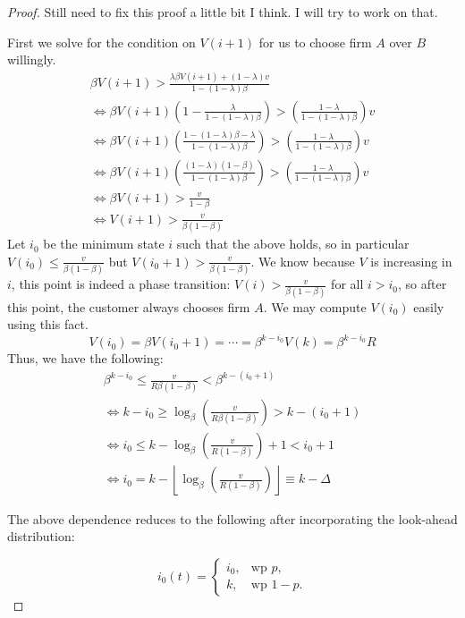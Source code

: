 \begin{proof}
{\nolan Still need to fix this proof a little bit I think. I will try to work on that.}

First we solve for the condition on $V(i+1)$ for us to choose firm $A$ over $B$ willingly.
\begin{gather*}
\beta V(i+1) > \frac{\lambda \beta V(i+1) + (1-\lambda)v}{1-(1-\lambda)\beta} \\
\iff \beta V(i+1) \left(1-\frac{\lambda}{1-(1-\lambda)\beta} \right) > \left(\frac{1-\lambda}{1-(1-\lambda)\beta} \right) v \\
\iff \beta V(i+1) \left(\frac{1-(1-\lambda)\beta -\lambda}{1-(1-\lambda)\beta} \right) > \left(\frac{1-\lambda}{1-(1-\lambda)\beta} \right) v \\
\iff \beta V(i+1) \left(\frac{(1-\lambda)(1-\beta)}{1-(1-\lambda)\beta} \right) > \left(\frac{1-\lambda}{1-(1-\lambda)\beta} \right) v \\
\iff \beta V(i+1) > \frac{v}{1-\beta} \\
\iff V(i+1) > \frac{v}{\beta(1-\beta)}
\end{gather*}
Let $i_0$ be the minimum state $i$ such that the above holds, so in particular $V(i_0) \le \frac{v}{\beta(1-\beta)}$ but $V(i_0+1) > \frac{v}{\beta(1-\beta)}$. We know because $V$ is increasing in $i$, this point is indeed a phase transition: $V(i) > \frac{v}{\beta(1-\beta)}$ for all $i > i_0$, so after this point, the customer always chooses firm $A$. We may compute $V(i_0)$ easily using this fact.
\begin{equation*}
V(i_0) = \beta V(i_0+1) = \cdots = \beta^{k-i_0}V(k) = \beta^{k-i_0}R
\end{equation*}
Thus, we have the following:
\begin{gather*}
\beta^{k-i_0} \le \frac{v}{R\beta(1-\beta)} < \beta^{k-(i_0+1)} \\ 
\iff k-i_0 \ge \log_{\beta}\left(\frac{v}{R\beta(1-\beta)} \right) > k-(i_0+1) \\
\iff i_0 \le k - \log_{\beta}\left(\frac{v}{R(1-\beta)} \right) + 1 < i_0 + 1\\
\iff i_0 = k - \left\lfloor \log_{\beta}\left(\frac{v}{R(1-\beta)}\right) \right\rfloor \equiv k-\Delta
\end{gather*}

The above dependence reduces to the following after incorporating the look-ahead distribution:

\begin{equation*}
  i_0(t)=\begin{cases}
    i_0, & \text{wp } p,\\
    k, & \text{wp } 1-p.
  \end{cases}
\end{equation*}
\end{proof}

